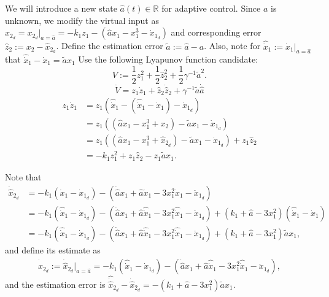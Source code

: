 \documentclass{article}
\begin{document}
We will introduce a new state $\hat{a}(t) \in \mathbb{R}$ for adaptive control.
Since $a$ is unknown, we modify the virtual input as
$\hat{x}_{2_{d}} = x_{2_{d}} \vert_{a = \hat{a}} = -k_{1}z_{1} - (\hat{a} x_{1} - x_{1}^{3} - \dot{x}_{1_{d}}) $
and corresponding error $\hat{z}_{2} := x_{2} - \hat{x}_{2_{d}}$.
Define the estimation error $\tilde{a} := \hat{a} - a$.
Also, note for $\hat{\dot{x}}_{1} := \dot{x}_{1} \vert_{a = \hat{a}}$ that
$\hat{\dot{x}}_{1} - \dot{x}_{1} = \tilde{a} x_{1} $
Use the following Lyapunov function candidate:
\begin{equation}
  V := \frac{1}{2} z_{1}^{2} + \frac{1}{2} \hat{z}_{2}^{2} + \frac{1}{2} \gamma^{-1} \tilde{a}^{2}.
\end{equation}
\begin{equation}
  \dot{V} = z_{1} \dot{z}_{1} + \hat{z}_{2} \dot{\hat{z}}_{2} + \gamma^{-1} \tilde{a} \dot{\hat{a}}
\end{equation}
\begin{align}
  \label{eq:z_1}
  z_{1} \dot{z}_{1} &= z_{1} (\hat{\dot{x}}_{1} - (\hat{\dot{x}}_{1} - \dot{x}_{1}) - \dot{x}_{1_{d}})
  \\
                    &= z_{1} ((\hat{a} x_{1} - x_{1}^{3} + x_{2}) - \tilde{a} x_{1} - \dot{x}_{1_{d}})
                    \\
                    &= z_{1} ((\hat{a} x_{1} - x_{1}^{3} + \hat{x}_{2_{d}}) - \tilde{a} x_{1} - \dot{x}_{1_{d}}) + z_{1} \hat{z}_{2}
                    \\
                    &= -k_{1} z_{1}^{2} + z_{1} \hat{z}_{2} - z_{1} \tilde{a} x_{1}.
\end{align}

Note that
\begin{align}
  \dot{\hat{x}}_{2_{d}} &= -k_{1} (\dot{x}_{1} - \dot{x}_{1_{d}}) - (\dot{\hat{a}} x_{1} + \hat{a} \dot{x}_{1} - 3x_{1}^{2} \dot{x}_{1} - \ddot{x}_{1_{d}})
  \\
                        &= -k_{1} (\hat{\dot{x}}_{1} - \dot{x}_{1_{d}}) - (\dot{\hat{a}} x_{1} + \hat{a} \hat{\dot{x}}_{1} - 3x_{1}^{2} \hat{\dot{x}}_{1} - \ddot{x}_{1_{d}})
                        + (k_{1} + \hat{a} - 3x_{1}^{2}) (\hat{\dot{x}}_{1} - \dot{x}_{1})
                        \\
                        &= -k_{1} (\hat{\dot{x}}_{1} - \dot{x}_{1_{d}}) - (\dot{\hat{a}} x_{1} + \hat{a} \hat{\dot{x}}_{1} - 3x_{1}^{2} \hat{\dot{x}}_{1} - \ddot{x}_{1_{d}})
                        + (k_{1} + \hat{a} - 3x_{1}^{2}) \tilde{a} x_{1},
\end{align}
and define its estimate as
\begin{equation}
  \hat{\dot{\hat{x}}}_{2_{d}} := \dot{\hat{x}}_{2_{d}} \vert_{a = \hat{a}} = -k_{1} (\hat{\dot{x}}_{1} - \dot{x}_{1_{d}}) - (\dot{\hat{a}} x_{1} + \hat{a} \hat{\dot{x}}_{1} - 3x_{1}^{2} \hat{\dot{x}}_{1} - \ddot{x}_{1_{d}}),
\end{equation}
and the estimation error is $\hat{\dot{\hat{x}}}_{2_{d}} - \dot{\hat{x}}_{2_{d}} = -(k_{1}+\hat{a}-3x_{1}^{2})\tilde{a} x_{1} $.
\end{document}
